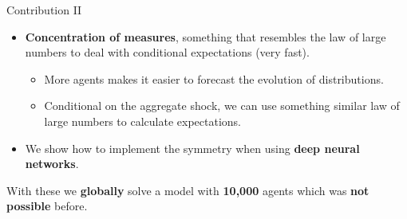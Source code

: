 \documentclass[aspectratio=169,10pt]{beamer}
\newcommand{\emphcolor}[1]{\textbf{\textcolor{emphcolorval}{#1}}}
\begin{document}
\begin{frame}{Contribution II}
	\begin{itemize}
	\item \emphcolor{Concentration of measures}, something that resembles the law of large numbers to deal with conditional expectations (very fast).\vspace{0.1in}
	\begin{itemize}
		\item More agents makes it easier to forecast the evolution of distributions. \vspace{0.1in}  
		\item Conditional on the aggregate shock, we can use something similar law of large numbers to calculate expectations.  \vspace{0.1in}    
	\end{itemize}	 
	
	
	\item We show how to implement the symmetry when using \emphcolor{deep neural networks}. \vspace{0.1in} 
	
	\end{itemize}
	With these we \emphcolor{globally} solve a model with \emphcolor{10,000} agents which was \emphcolor{not possible} before.
\end{frame}



		
\end{document}
